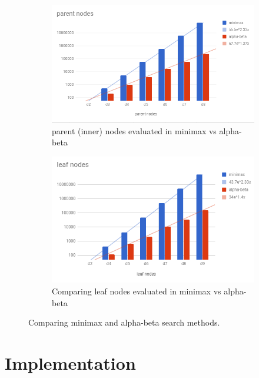\documentclass{article}
\begin{document}
\begin{figure}[h!]
    \centering
    \begin{subfigure}[b]{0.4\linewidth}
        \includegraphics[width=\linewidth]{images/parent-nodes-abvmm.png}
        \caption{parent (inner) nodes evaluated in minimax vs alpha-beta}
    \end{subfigure}
    \begin{subfigure}[b]{0.4\linewidth}
        \includegraphics[width=\linewidth]{images/leaf-nodes-abvmm.png}
        \caption{Comparing leaf nodes evaluated in minimax vs alpha-beta}
    \end{subfigure}

    \caption{Comparing minimax and alpha-beta search methods.}
    \label{fig:ab-v-mm}
\end{figure}

\section{Implementation}
\end{document}

